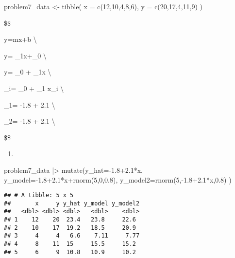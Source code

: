 \documentclass[
]{article}
\newenvironment{Shaded}{\begin{snugshade}}{\end{snugshade}}
\newcommand{\AttributeTok}[1]{\textcolor[rgb]{0.77,0.63,0.00}{#1}}
\newcommand{\DecValTok}[1]{\textcolor[rgb]{0.00,0.00,0.81}{#1}}
\newcommand{\FloatTok}[1]{\textcolor[rgb]{0.00,0.00,0.81}{#1}}
\newcommand{\FunctionTok}[1]{\textcolor[rgb]{0.00,0.00,0.00}{#1}}
\newcommand{\NormalTok}[1]{#1}
\newcommand{\OtherTok}[1]{\textcolor[rgb]{0.56,0.35,0.01}{#1}}
\newcommand{\SpecialCharTok}[1]{\textcolor[rgb]{0.00,0.00,0.00}{#1}}
\providecommand{\tightlist}{%
  \setlength{\itemsep}{0pt}\setlength{\parskip}{0pt}}
\begin{document}
\begin{Shaded}
\begin{Highlighting}[]
\NormalTok{problem7\_data }\OtherTok{\textless{}{-}} 
  \FunctionTok{tibble}\NormalTok{(}
    \AttributeTok{x =} \FunctionTok{c}\NormalTok{(}\DecValTok{12}\NormalTok{,}\DecValTok{10}\NormalTok{,}\DecValTok{4}\NormalTok{,}\DecValTok{8}\NormalTok{,}\DecValTok{6}\NormalTok{), }
    \AttributeTok{y =} \FunctionTok{c}\NormalTok{(}\DecValTok{20}\NormalTok{,}\DecValTok{17}\NormalTok{,}\DecValTok{4}\NormalTok{,}\DecValTok{11}\NormalTok{,}\DecValTok{9}\NormalTok{)}
\NormalTok{  )}
\end{Highlighting}
\end{Shaded}

\$\$

y=mx+b \textbackslash{}

y= \beta\_1x+\beta\_0 \textbackslash{}

y= \beta\_0 + \beta\_1x \textbackslash{}

\_i= \beta\_0 + \beta\_1 x\_i \textbackslash{}

\_1= -1.8 + 2.1  \textbackslash{}

\_2= -1.8 + 2.1  \textbackslash{}

\$\$

\begin{enumerate}
\def\labelenumi{\alph{enumi}.}
\setcounter{enumi}{1}
\tightlist
\item
\end{enumerate}

\begin{Shaded}
\begin{Highlighting}[]
\NormalTok{problem7\_data }\SpecialCharTok{|\textgreater{}}
  \FunctionTok{mutate}\NormalTok{(}\AttributeTok{y\_hat=}\SpecialCharTok{{-}}\FloatTok{1.8+2.1}\SpecialCharTok{*}\NormalTok{x, }
         \AttributeTok{y\_model=}\SpecialCharTok{{-}}\FloatTok{1.8+2.1}\SpecialCharTok{*}\NormalTok{x}\SpecialCharTok{+}\FunctionTok{rnorm}\NormalTok{(}\DecValTok{5}\NormalTok{,}\DecValTok{0}\NormalTok{,}\FloatTok{0.8}\NormalTok{),}
         \AttributeTok{y\_model2=}\FunctionTok{rnorm}\NormalTok{(}\DecValTok{5}\NormalTok{,}\SpecialCharTok{{-}}\FloatTok{1.8+2.1}\SpecialCharTok{*}\NormalTok{x,}\FloatTok{0.8}\NormalTok{)}
\NormalTok{        )}
\end{Highlighting}
\end{Shaded}

\begin{verbatim}
## # A tibble: 5 x 5
##       x     y y_hat y_model y_model2
##   <dbl> <dbl> <dbl>   <dbl>    <dbl>
## 1    12    20  23.4   23.8     22.6 
## 2    10    17  19.2   18.5     20.9 
## 3     4     4   6.6    7.11     7.77
## 4     8    11  15     15.5     15.2 
## 5     6     9  10.8   10.9     10.2
\end{verbatim}
\end{document}
